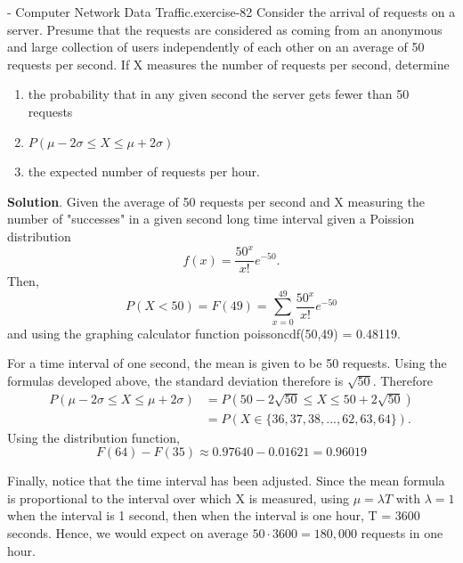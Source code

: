 \documentclass[10pt,]{book}
\numberwithin{equation}{section}
\newcommand{\lt}{<}
\begin{document}
\begin{inlineexercise}{- Computer Network Data Traffic.}{exercise-82}%
\hypertarget{p-1181}{}%
Consider the arrival of requests on a server. Presume that the requests are considered as coming from an anonymous and large collection of users independently of each other on an average of 50 requests per second. If X measures the number of requests per second, determine \leavevmode%
\begin{enumerate}
\item\hypertarget{li-306}{}the probability that in any given second the server gets fewer than 50 requests%
\item\hypertarget{li-307}{}\(P(\mu - 2\sigma \le X \le \mu + 2\sigma)\)%
\item\hypertarget{li-308}{}the expected number of requests per hour.%
\end{enumerate}
 \textbf{Solution}.\quad%
\hypertarget{p-1182}{}%
Given the average of 50 requests per second and X measuring the number of "successes" in a given second long time interval given a Poission distribution%
\begin{equation*}
f(x) = \frac{50^x}{x!}e^{-50}.
\end{equation*}
Then,%
\begin{equation*}
P(X \lt 50) = F(49) = \sum_{x=0}^{49} \frac{50^x}{x!} e^{-50}
\end{equation*}
and using the graphing calculator function poissoncdf(50,49) = 0.48119.%
\par
\hypertarget{p-1183}{}%
For a time interval of one second, the mean is given to be 50 requests. Using the formulas developed above, the standard deviation therefore is \(\sqrt{50}\). Therefore%
\begin{align*}
P(\mu - 2\sigma \le X \le \mu + 2\sigma) & = P(50 - 2\sqrt{50} \le X \le 50 + 2\sqrt{50})\\
& = P(X \in \{ 36, 37, 38, ..., 62, 63, 64 \}).
\end{align*}
Using the distribution function,%
\begin{equation*}
F(64) - F(35) \approx 0.97640 - 0.01621 = 0.96019
\end{equation*}
%
\par
\hypertarget{p-1184}{}%
Finally, notice that the time interval has been adjusted. Since the mean formula is proportional to the interval over which X is measured, using \(\mu = \lambda T\) with \(\lambda = 1\) when the interval is 1 second, then when the interval is one hour, T = 3600 seconds. Hence, we would expect on average \(50 \cdot 3600 = 180,000\) requests in one hour.%
%
\end{inlineexercise}
%
%
%
\typeout{************************************************}
\typeout{************************************************}
%
\end{document}

